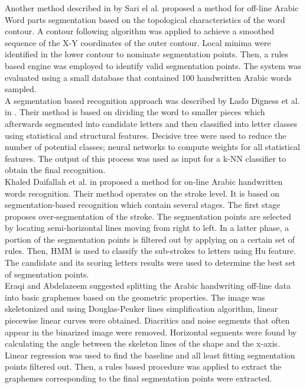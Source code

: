 \documentclass[journal,compsoc]{IEEEtran}
\begin{document}
Another method described in \cite{sari2002off} by Sari el al. proposed a method for off-line Arabic Word parts segmentation based on the topological characteristics of the word contour. A contour following  algorithm was applied to achieve a smoothed sequence of the X-Y coordinates of the outer contour. Local minima were identified in the lower contour to nominate segmentation points. Then, a rules based engine was employed to identify valid segmentation points. The system was evaluated using a small database that contained 100 handwritten Arabic words sampled.\\

A segmentation based recognition approach was described by Laslo Digness et al. in \cite{Dinges2011}. Their method is based on dividing the word to smaller pieces which afterwards segmented into candidate letters and then classified into letter classes using statistical and structural features. Decisive tree were used to reduce the number of potential classes; neural networks to compute weights for all statistical features. The output of this process was used as input for a k-NN classifier to obtain the final recognition.\\

Khaled Daifallah et al. in \cite{daifallah2009recognition} proposed a method for on-line Arabic handwritten words recognition. Their method operates on the stroke level. It is based on segmentation-based recognition which contain several stages. The first stage proposes over-segmentation of the stroke. The segmentation points are selected by locating semi-horizontal lines moving from right to left. In a latter phase, a portion of the segmentation points is filtered out by applying on a certain set of rules. Then, HMM is used to classify the sub-strokes to letters using Hu feature. The candidate and its scoring letters results were used to determine the best set of segmentation points. \\

Eraqi and Abdelazeem \cite{eraqi2012new} suggested splitting the Arabic handwriting off-line data into basic graphemes based on the geometric properties. The image was skeletonized and using Douglas-Peuker lines simplification algorithm, linear piecewise linear curves were obtained. Diacritics and noise segments that often appear in the binarized image were removed. Horizontal segments were found by calculating the angle between the skeleton lines of the shape and the x-axis. Linear regression was used to find the baseline and all least fitting segmentation points filtered out. Then, a rules based procedure was applied to extract the graphemes corresponding to the final segmentation points were extracted.    
\end{document}
